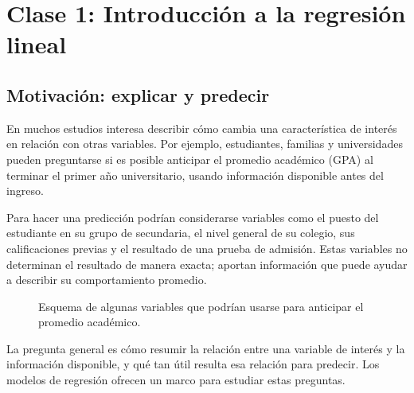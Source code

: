 \chapter{Clase 1: Introducción a la regresión lineal}

\section{Motivación: explicar y predecir}

En muchos estudios interesa describir cómo cambia una característica de interés en relación con otras variables. Por ejemplo, estudiantes, familias y universidades pueden preguntarse si es posible anticipar el promedio académico (GPA) al terminar el primer año universitario, usando información disponible antes del ingreso.

Para hacer una predicción podrían considerarse variables como el puesto del estudiante en su grupo de secundaria, el nivel general de su colegio, sus calificaciones previas y el resultado de una prueba de admisión. Estas variables no determinan el resultado de manera exacta; aportan información que puede ayudar a describir su comportamiento promedio.

\begin{figure}[H]
\centering
{}
\caption{Esquema de algunas variables que podrían usarse para anticipar el promedio académico.}
\label{fig:predictores-gpa}
\end{figure}

La pregunta general es cómo resumir la relación entre una variable de interés y la información disponible, y qué tan útil resulta esa relación para predecir. Los modelos de regresión ofrecen un marco para estudiar estas preguntas.

